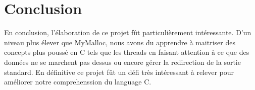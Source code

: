 \documentclass{article}
\begin{document}
\section{Conclusion}
En conclusion, l'élaboration de ce projet fût particulièrement intéressante. D'un niveau plus élever que MyMalloc, nous avons du apprendre à maitriser des concepts plus poussé en C tels que les threads en faisant attention à ce que des données ne se marchent pas dessus ou encore gérer la redirection de la sortie standard.
En définitive ce projet fût un défi très intéressant à relever pour améliorer notre comprehenssion du language C.
\end{document}

